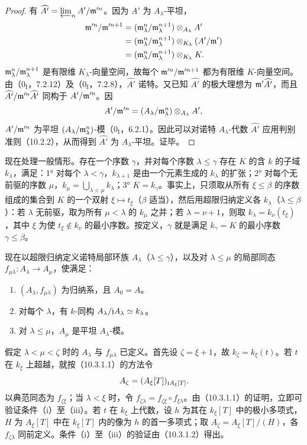 \begin{proof}
有 $\widehat{A'}=\varprojlim_n A'/\mathfrak m'^n$。因为 $A'$ 为 $A_\lambda$-平坦，
\[
\begin{aligned}
\mathfrak m'^n/\mathfrak m'^{n+1}
&=(\mathfrak m_\lambda^n/\mathfrak m_\lambda^{n+1})\otimes_{A_\lambda}A'\\
&=(\mathfrak m_\lambda^n/\mathfrak m_\lambda^{n+1})\otimes_{K_\lambda}(A'/\mathfrak m')\\
&=(\mathfrak m_\lambda^n/\mathfrak m_\lambda^{n+1})\otimes_{K_\lambda}K.
\end{aligned}
\]
$\mathfrak m_\lambda^n/\mathfrak m_\lambda^{n+1}$ 是有限维 $K_\lambda$-向量空间，故每个 $\mathfrak m'^n/\mathfrak m'^{n+1}$ 都为有限维 $K$-向量空间。由（$0_{\mathrm I}$，7.2.12）及（$0_{\mathrm I}$，7.2.8），$\widehat{A'}$ 诺特。又已知 $\widehat{A'}$ 的极大理想为 $\mathfrak m'\widehat{A'}$，而且 $\widehat{A'}/\mathfrak m'^n\widehat{A'}$ 同构于 $A'/\mathfrak m'^n$。因
\[
A'/\mathfrak m'^n=(A_\lambda/\mathfrak m_\lambda^n)\otimes_{A_\lambda}A',
\]
$A'/\mathfrak m'^n$ 为平坦 $(A_\lambda/\mathfrak m_\lambda^n)$-模（$0_{\mathrm I}$，6.2.1）。因此可以对诺特 $A_\lambda$-代数 $\widehat{A'}$ 应用判别准则（10.2.2），从而得到 $\widehat{A'}$ 为 $A_\lambda$-平坦。证毕。
\end{proof}

现在处理一般情形。存在一个序数 $\gamma$，并对每个序数 $\lambda\leq\gamma$ 存在 $K$ 的含 $k$ 的子域 $k_\lambda$，满足：1° 对每个 $\lambda<\gamma$，$k_{\lambda+1}$ 是由一个元素生成的 $k_\lambda$ 的扩张；2° 对每个无前驱的序数 $\mu$，$k_\mu=\bigcup_{\lambda<\mu}k_\lambda$；3° $K=k_\gamma$。事实上，只须取从所有 $\xi\leq\beta$ 的序数组成的集合到 $K$ 的一个双射 $\xi\mapsto t_\xi$（$\beta$ 适当），然后用超限归纳定义各 $k_\lambda$（$\lambda\leq\beta$）：若 $\lambda$ 无前驱，取为所有 $\mu<\lambda$ 的 $k_\mu$ 之并；若 $\lambda=\nu+1$，则取 $k_\lambda=k_\nu(t_\xi)$，其中 $\xi$ 为使 $t_\xi\notin k_\nu$ 的最小序数。按定义，$\gamma$ 就是满足 $k_\gamma=K$ 的最小序数 $\gamma\leq\beta$。

现在以超限归纳定义诺特局部环族 $A_\lambda$（$\lambda\leq\gamma$），以及对 $\lambda\leq\mu$ 的局部同态 $f_{\mu\lambda}:A_\lambda\to A_\mu$，使满足：
\begin{enumerate}[label=(\roman*)]
\item $(A_\lambda,f_{\mu\lambda})$ 为归纳系，且 $A_0=A$。
\item 对每个 $\lambda$，有 $k$-同构 $A_\lambda/\mathfrak j A_\lambda\simeq k_\lambda$。
\item 对 $\lambda\leq\mu$，$A_\mu$ 是平坦 $A_\lambda$-模。
\end{enumerate}
假定 $\lambda<\mu<\zeta$ 时的 $A_\lambda$ 与 $f_{\mu\lambda}$ 已定义。首先设 $\zeta=\xi+1$，故 $k_\zeta=k_\xi(t)$。若 $t$ 在 $k_\xi$ 上超越，就按（10.3.1.1）的方法令
\[
A_\zeta=(A_\xi[T])_{\mathfrak j A_\xi[T]}.
\]
以典范同态为 $f_{\zeta\xi}$；当 $\lambda<\xi$ 时，令 $f_{\zeta\lambda}=f_{\zeta\xi}\circ f_{\xi\lambda}$。由（10.3.1.1）的证明，立即可验证条件（i）至（iii）。若 $t$ 在 $k_\xi$ 上代数，设 $h$ 为其在 $k_\xi[T]$ 中的极小多项式，$H$ 为 $A_\xi[T]$ 中在 $k_\xi[T]$ 内的像为 $h$ 的首一多项式；取 $A_\zeta=A_\xi[T]/(H)$，各 $f_{\zeta\lambda}$ 同前定义。条件（i）至（iii）的验证由（10.3.1.2）得出。

